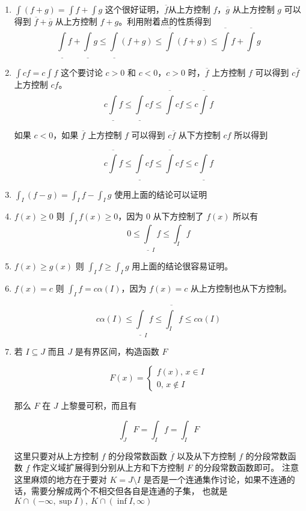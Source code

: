 \begin{enumerate}
    \item $\int(f+g) = \int f + \int g $ 这个很好证明，$\overline{f}$从上方控制 $f$，$\overline{g}$ 从上方控制 $g$ 可以得到 $\overline{f}+\overline{g}$ 从上方控制 $f+g$。利用附着点的性质得到
    \[
  \underline{\int}f + \underline{\int}g \le \underline{\int}(f+g)  \le \overline{\int}(f+g) \le \overline{\int}f + \overline{\int}g
    \]

    \item $\int cf = c \int f$ 这个要讨论 $c > 0$ 和 $c < 0$，$c > 0$ 时，$\overline{f}$ 上方控制 $f$ 可以得到 $c\overline{f}$ 上方控制 $cf$。
    \[
  c\underline{\int}f \le  \underline{\int}cf \le \overline{\int}cf \le c \overline{\int}f 
    \]

    如果 $c < 0$，如果 $\overline{f}$ 上方控制 $f$ 可以得到 $c\overline{f}$ 从下方控制 $cf$ 所以得到

    \[
      c\overline{\int}f   \le \underline{\int}cf \le \overline{\int} cf \le c \underline{\int}f
    \]

    \item $\int_{I}(f-g) = \int_{I}f - \int_{I}g $ 使用上面的结论可以证明

    \item $f(x) \ge 0$ 则 $\int_{I} f(x) \ge 0$，因为 $0$ 从下方控制了 $f(x)$ 所以有
    \[
        0 \le \underline{\int}_{I} f \le \int_{I} f
    \]

    \item $f(x) \ge g(x)$ 则 $\int_{I}f \ge \int_{I} g$ 用上面的结论很容易证明。

    \item $f(x) = c$ 则 $\int_{I}f = c \alpha(I)$，因为 $f(x) =c$ 从上方控制也从下方控制。

    \[
        c\alpha(I) \le \underline{\int}_I f \le \overline{\int_I}f \le c \alpha(I)
    \]

    \item 若 $I \subseteq J$ 而且 $J$ 是有界区间，构造函数 $F$

    \[
    F(x) = \begin{cases}
        f(x),\, x \in I \\
        0,\, x \notin I 
    \end{cases}
    \]

    那么 $F$ 在 $J$ 上黎曼可积，而且有

    \[
        \int_{J} F = \int_{I} f = \int_{I} F
    \]

    这里只要对从上方控制 $f$ 的分段常数函数 $\overline{f}$ 以及从下方控制 $f$
    的分段常数函数 $\underline{f}$ 作定义域扩展得到分别从上方和下方控制 $F$ 的分段常数函数即可。
    注意这里麻烦的地方在于要对 $K = J \setminus I$ 是否是一个连通集作讨论，如果不连通的话，需要分解成两个不相交但各自是连通的子集，
    也就是 $K \cap (-\infty, \sup I),\: K \cap (\inf I, \infty)$


\end{enumerate}
